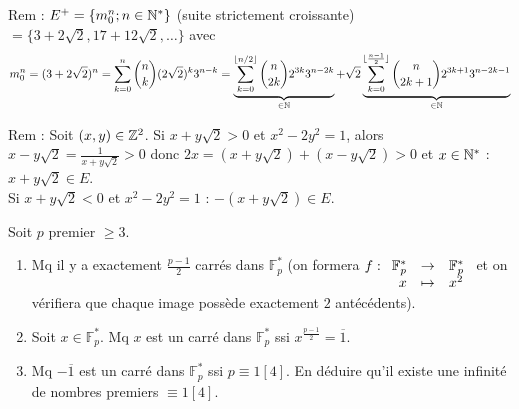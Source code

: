 \begin{solution}
\begin{remarkbox}
Rem : $E^+ = \{m_0^n ; n \in \mathbb N^*\}$ (suite strictement croissante) $= \{3 + 2\sqrt{2}, 17 + 12\sqrt{2}, \dots\}$ avec
\[ m_0^n = (3 + 2\sqrt{2})^n = \sum_{k=0}^n \binom{n}{k} (2\sqrt{2})^k 3^{n-k} = \underbrace{\sum_{k=0}^{\lfloor n/2 \rfloor} \binom{n}{2k} 2^{3k} 3^{n-2k}}_{\in \mathbb N} + \sqrt{2} \underbrace{\sum_{k=0}^{\lfloor \frac{n-1}{2} \rfloor} \binom{n}{2k+1} 2^{3k+1} 3^{n-2k-1}}_{\in \mathbb N} \]

Rem : Soit $(x,y) \in \mathbb Z^2$. Si $x + y\sqrt{2} > 0$ et $x^2 - 2y^2 = 1$, alors $x - y\sqrt{2} = \frac{1}{x + y\sqrt{2}} > 0$ donc $2x = (x + y\sqrt{2}) + (x - y\sqrt{2}) > 0$ et $x \in \mathbb N^*$ : $x + y\sqrt{2} \in E$. \\
Si $x + y\sqrt{2} < 0$ et $x^2 - 2y^2 = 1$ : $-(x + y\sqrt{2}) \in E$.
\end{remarkbox}
\end{solution}


\begin{statementbox}
[À RETENIR] Soit $p$ premier $\geq 3$.
\begin{enumerate}[label=\alph*)]
  \item Mq il y a exactement $\frac{p-1}{2}$ carrés dans $\mathbb{F}_p^*$ (on formera $f : \begin{array}[t]{rcl} \mathbb{F}_p^* & \to & \mathbb{F}_p^* \\ x & \mapsto & x^2 \end{array}$ et on vérifiera que chaque image possède exactement $2$ antécédents).
  \item Soit $x \in \mathbb{F}_p^*$. Mq $x$ est un carré dans $\mathbb{F}_p^*$ ssi $x^{\frac{p-1}{2}} = \overline{1}$.
  \item Mq $-\overline{1}$ est un carré dans $\mathbb{F}_p^*$ ssi $p \equiv 1 [4]$. En déduire qu'il existe une infinité de nombres premiers $\equiv 1 [4]$.
\end{enumerate}
\end{statementbox}

